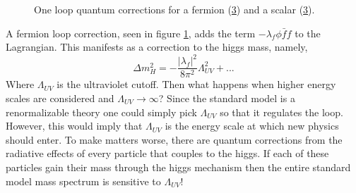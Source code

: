 \begin{figure}[t]
  \centering
  \begin{subfigure}[trim = 0mm 0mm 0mm 0mm, clip, width=3cm]{.4\textwidth}
                \caption{}
                \label{fig:fermionLoop}
\end{subfigure}
\begin{subfigure}[trim = 0mm 0mm 0mm 0mm, clip, width=3cm]{.4\textwidth}
	\caption{}
                \label{fig:scalarLoop}
                	
  \end{subfigure}
   \caption[]{One loop quantum corrections for a fermion (\ref{fig:scalarLoop}) and a scalar (\ref{fig:scalarLoop}). }
\end{figure}

A fermion loop correction, seen in figure \ref{fig:fermionLoop}, 
adds the term $-\lambda_{f}\phi \bar{f}f$ to the Lagrangian.
This manifests as a correction to the higgs mass, namely,
\begin{equation}
\Delta m_{H}^{2}=-\frac{|\lambda_{f}|^{2}}{8\pi^{2}}\Lambda_{UV}^{2}+...
\label{eq:SUS1}
\end{equation}
Where $\Lambda_{UV}$ is the ultraviolet cutoff. %
Then what happens when higher energy scales are considered and $\Lambda_{UV}\rightarrow \infty$?
Since the standard model is a renormalizable theory one could simply
pick $\Lambda_{UV}$ so that it regulates the loop. However, this would imply
that $\Lambda_{UV}$ is the energy scale at which new physics should enter.
To make matters worse, there are quantum corrections from the radiative
effects of every particle that couples to the higgs. If each of these 
particles gain their mass through the higgs mechanism then the entire standard model 
mass spectrum is sensitive to $\Lambda_{UV}$!

